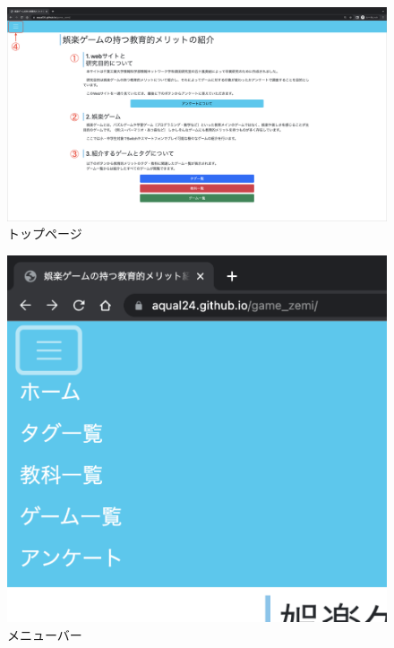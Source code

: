 \documentclass[12pt,a4j,titlepage]{ltjsarticle}
\begin{document}
\begin{figure}[H]
\begin{center}
 \includegraphics[keepaspectratio, scale=0.15]{PDF/toppage.pdf}
\end{center}
 \caption{トップページ}
 \label{fig:トップページ}
\end{figure}

\begin{figure}[H]
\begin{center}
 \includegraphics[keepaspectratio, scale=0.3]{PDF/menubar.pdf}
\end{center}
 \caption{メニューバー}
 \label{fig:メニューバー}
\end{figure}
\end{document}
